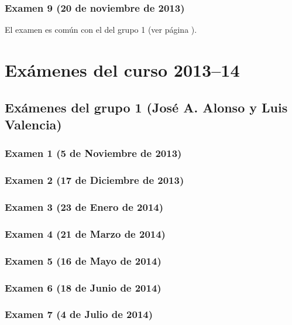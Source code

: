 \documentclass[a4paper,12pt,twoside]{book}
\begin{document}
\subsection{Examen 9 (20 de noviembre de 2013)}
El examen es común con el del grupo 1 (ver página \pageref{examen_12_13_2_9}).

\chapter{Exámenes del curso 2013--14}

\section{Exámenes del grupo 1 (José A. Alonso y Luis Valencia)}
\subsection{Examen 1 (5 de Noviembre de 2013)}
\subsection{Examen 2 (17 de Diciembre de 2013)}
\subsection{Examen 3 (23 de Enero de 2014)}
 \label{examen_13_14_3_3}
\subsection{Examen 4 (21 de Marzo de 2014)}
\subsection{Examen 5 (16 de Mayo de 2014)}
\subsection{Examen 6 (18 de Junio de 2014)}
 \label{examen_13_14_3_6}
\subsection{Examen 7 (4 de Julio de 2014)}
 \label{examen_13_14_3_7}
\end{document}
